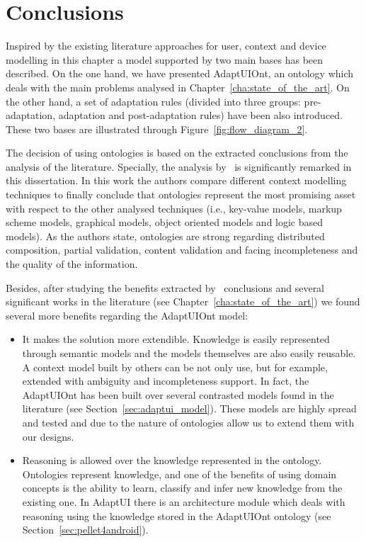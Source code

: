 \section{Conclusions}
\label{sec:adaptui_conclusions}

Inspired by the existing literature approaches for user, context and device
modelling in this chapter a model supported by two main bases has been described.
On the one hand, we have presented AdaptUIOnt, an ontology which deals with the
main problems analysed in Chapter~\ref{cha:state_of_the_art}. On the other hand,
a set of adaptation rules (divided into three groups: pre-adaptation, adaptation
and post-adaptation rules) have been also introduced. These two bases are
illustrated through Figure~\ref{fig:flow_diagram_2}.

The decision of using ontologies is based on the extracted conclusions from the
analysis of the literature. Specially, the analysis by~\citet{strang_context_2004}
is significantly remarked in this dissertation. In this work the authors compare
different context modelling techniques to finally conclude that ontologies
represent the most promising asset with respect to the other analysed techniques
(i.e., key-value models, markup scheme models, graphical models, object oriented
models and logic based models). As the authors state, ontologies are strong
regarding distributed composition, partial validation, content validation
and facing incompleteness and the quality of the information.

Besides, after studying the benefits extracted by~\citet{strang_context_2004}
conclusions and several significant works in the literature (see
Chapter~\ref{cha:state_of_the_art}) we found several more benefits regarding the
AdaptUIOnt model:

\begin{itemize}
  \item It makes the solution more extendible. Knowledge is easily represented
  through semantic models and the models themselves are also easily reusable.
  A context model built by others can be not only use, but for example, extended
  with ambiguity and incompleteness support. In fact, the AdaptUIOnt has been
  built over several contrasted models found in the literature (see
  Section~\ref{sec:adaptui_model}). These models are highly spread and tested
  and due to the nature of ontologies allow us to extend them with our designs.
  
  \item Reasoning is allowed over the knowledge represented in the ontology.
  Ontologies represent knowledge, and one of the benefits of using domain
  concepts is the ability to learn, classify and infer new knowledge from the
  existing one. In AdaptUI there is an architecture module which deals with
  reasoning using the knowledge stored in the AdaptUIOnt ontology (see
  Section~\ref{sec:pellet4android}).
\end{itemize}


